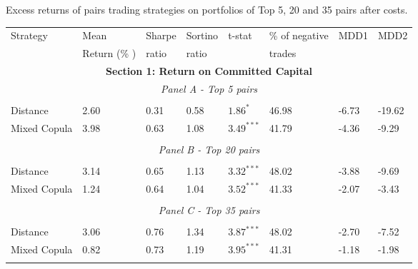 \documentclass[a4paper]{article}
\begin{document}
\begin{threeparttable}[H]
	\centering \tiny
	\caption{Excess returns of pairs trading strategies on portfolios of Top 5, 20 and 35 pairs after costs.}
	\begin{tabularx}{\textwidth}{@{\extracolsep{\fill}}llllllll@{}}
		\toprule
		Strategy & Mean  & Sharpe & Sortino & t-stat & \% of negative   & MDD1 & MDD2 \\
		& Return (\% ) & ratio &  ratio     &  &  trades     &       &  \\
		\midrule
		\multicolumn{8}{c}{\textbf{Section 1: Return on Committed Capital}} \\
		\multicolumn{8}{c}{\textit{Panel A - Top 5 pairs}} \\
		&       &       &       &       &       &       &  \\
		Distance & 2.60  & 0.31  & 0.58  & $1.86^{*}$  & 46.98 & -6.73    & -19.62 \\
		Mixed Copula &  3.98  &  0.63  & 1.08  &  $3.49^{***}$  &  41.79 &  -4.36  &  -9.29 \\
		\multicolumn{1}{r}{} & \multicolumn{1}{r}{} & \multicolumn{1}{r}{} & \multicolumn{1}{r}{} & \multicolumn{1}{r}{} & \multicolumn{1}{r}{} & \multicolumn{1}{r}{} & \multicolumn{1}{r}{} \\
		\multicolumn{8}{c}{\textit{Panel B - Top 20 pairs}} \\
		&       &       &       &       &       &       &  \\
		Distance &  3.14  &  0.65  & 1.13  & $3.32^{***}$  & 48.02 & -3.88  & -9.69 \\
		Mixed Copula  & 1.24  & 0.64  & 1.04  & $3.52^{***}$  & 41.33 &  -2.07  &  -3.43  \\
		\multicolumn{1}{r}{} & \multicolumn{1}{r}{} & \multicolumn{1}{r}{} & \multicolumn{1}{r}{} & \multicolumn{1}{r}{} & \multicolumn{1}{r}{} & \multicolumn{1}{r}{} & \multicolumn{1}{r}{} \\
		\multicolumn{8}{c}{\textit{Panel C - Top 35 pairs}} \\
		&       &       &       &       &       &       &  \\
		Distance &  3.06  &  0.76  & 1.34  & $3.87^{***}$  & 48.02 & -2.70  & -7.52 \\
		Mixed Copula & 0.82  & 0.73  & 1.19  & $3.95^{***}$  & 41.31 &  -1.18  &  -1.98  \\
		\multicolumn{1}{r}{} & \multicolumn{1}{r}{} & \multicolumn{1}{r}{} & \multicolumn{1}{r}{} & \multicolumn{1}{r}{} & \multicolumn{1}{r}{} & \multicolumn{1}{r}{} & \multicolumn{1}{r}{} \\

\end{tabularx}
\end{threeparttable}
\end{document}
